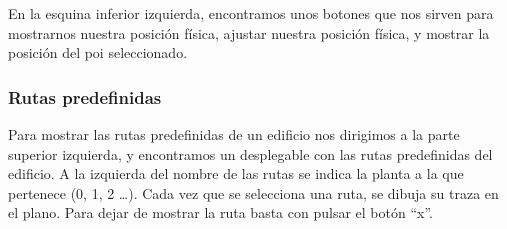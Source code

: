 En la esquina inferior izquierda, encontramos unos botones que nos sirven para mostrarnos nuestra posición física, ajustar nuestra posición física, y mostrar la posición del poi seleccionado.



\subsubsection{Rutas predefinidas}

Para mostrar las rutas predefinidas de un edificio nos dirigimos a la parte superior izquierda, y encontramos un desplegable con las rutas predefinidas del edificio. A la izquierda del nombre de las rutas se indica la planta a la que pertenece (0, 1, 2 \ldots). Cada vez que se selecciona una ruta, se dibuja su traza en el plano. Para dejar de mostrar la ruta basta con pulsar el botón ``x''.


